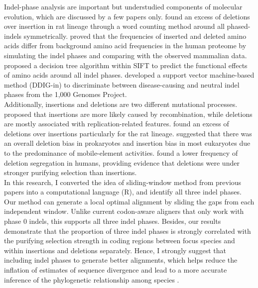 \indent Indel-phase analysis are important but understudied components of molecular evolution, which are discussed by a few papers only. \citeauthor{taylor2004occurrence} found an excess of deletions over insertion in rat lineage through a word counting method around all phased-indels symmetrically. \citeauthor{de2007dna} proved that the frequencies of inserted and deleted amino acids differ from background amino acid frequencies in the human proteome by simulating the indel phases and comparing with the observed mammalian data. \citeauthor{hu2013sift} proposed a decision tree algorithm within SIFT to predict the functional effects of amino acids around all indel phases. \citeauthor{zhao2013ddig} developed a support vector machine-based method (DDIG-in) to discriminate between disease-causing and neutral indel phases from the 1,000 Genomes Project. \\
\indent Additionally, insertions and deletions are two different mutational processes.  \citeauthor{kvikstad2007macaque} proposed that insertions are more likely caused by recombination, while deletions are mostly associated with replication-related features. \citeauthor{taylor2004occurrence} found an excess of deletions over insertions particularly for the rat lineage. \citeauthor{lynch2007origins} suggested that there was an overall deletion bias in prokaryotes and insertion bias in most eukaryotes due to the predominance of mobile-element activities. \citeauthor{sjodin2010insertion} found a lower frequency of deletion segregation in humans, providing evidence that deletions were under stronger purifying selection than insertions.\\
\indent In this research, I converted the idea of sliding-window method from previous papers into a computational language (R), and identify all three indel phases. Our method can generate a local optimal alignment by sliding the gaps from each independent window. Unlike current codon-aware aligners that only work with phase 0 indels, this supports all three indel phases. Besides, our results demonstrate that the proportion of three indel phases is strongly correlated with the purifying selection strength in coding regions between focus species and within insertions and deletions separately. Hence, I strongly suggest that including indel phases to generate better alignments, which helps reduce the inflation of estimates of sequence divergence and lead to a more accurate inference of the phylogenetic relationship among species \parencite{kapli2020phylogenetic}. 

